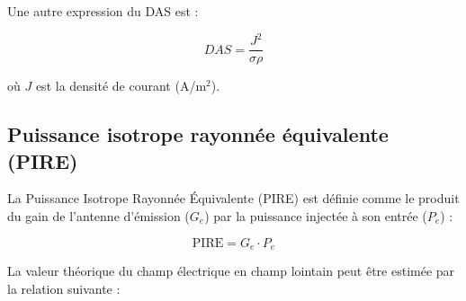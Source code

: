 \documentclass[12pt,a4paper]{article}
\begin{document}

Une autre expression du DAS est :

\begin{equation}
DAS = \frac{J^2}{\sigma \rho}
\end{equation}

où $J$ est la densité de courant (A/m$^2$).


\subsection{Puissance isotrope rayonnée équivalente (PIRE)}

La Puissance Isotrope Rayonnée Équivalente (PIRE) est définie comme le produit du gain de l’antenne d’émission ($G_e$) par la puissance injectée à son entrée ($P_e$) :

\begin{equation}
\text{PIRE} = G_e \cdot P_e
\end{equation}

La valeur théorique du champ électrique en champ lointain peut être estimée par la relation suivante :
\end{document}
